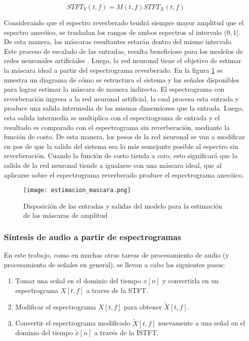 \begin{equation}
\label{eqn:dereverb}
	STFT_{Y}(t,f)= M(t,f) STFT_{X}(t,f) 
\end{equation}

Considerando que el espectro reverberado tendrá siempre mayor amplitud que el espectro anecóico, se trasladan los rangos de ambos espectros al intervalo $(0, 1]$. De esta manera, las máscaras resultantes estarán dentro del mismo intervalo. Este proceso de escalado de las entradas, resulta beneficioso para los modelos de redes neuronales artificiales \cite{lagartija}. Luego, la red neuronal tiene el objetivo de estimar la máscara ideal a partir del espectrograma reverberado. En la figura \ref{fig:red_estim} se muestra un diagrama de cómo se estructura el sistema y las señales disponibles para lograr estimar la máscara de manera indirecta. El espectrograma con reverberación ingresa a la red neuronal artificial, la cual procesa esta entrada y produce una salida intermedia de las mismas dimensiones que la entrada. Luego, esta salida intermedia se multiplica con el espectrograma de entrada y el resultado es comparado con el espectrograma sin reverberación, mediante la función de costo. De esta manera, los pesos de la red neuronal se van a modificar en pos de que la salida del sistema sea lo más semejante posible al espectro sin reverberación. Cuando la función de costo tienda a cero, esto significará que la salida de la red neuronal tiende a igualarse con una máscara ideal, que al aplicarse sobre el espectrograma reverberado produce el espectrograma anecóico. 

\begin{figure}[H]
  \centering{}
  \texttt{[image: estimacion\_mascara.png]}
  \caption{Disposición de las entradas y salidas del modelo para la estimación de las máscaras de amplitud}
  \label{fig:red_estim}
\end{figure}
  


\subsubsection{Síntesis de audio a partir de espectrogramas}

En este trabajo, como en muchas otras tareas de procesamiento de audio (y procesamiento de señales en general), se llevan a cabo los siguientes pasos:

\begin{enumerate}
\item Tomar una señal en el dominio del tiempo $x[n]$ y convertirla en un espectrograma $X[t,f]$ a traves de la STFT.
\item Modificar el espectrograma $X[t,f]$ para obtener $\tilde{X}[t,f]$. 
\item Convertir el espectrograma modificado $\tilde{X}[t,f]$ nuevamente a una señal en el dominio del tiempo $\tilde{x}[n]$ a través de la ISTFT.
\end{enumerate}

